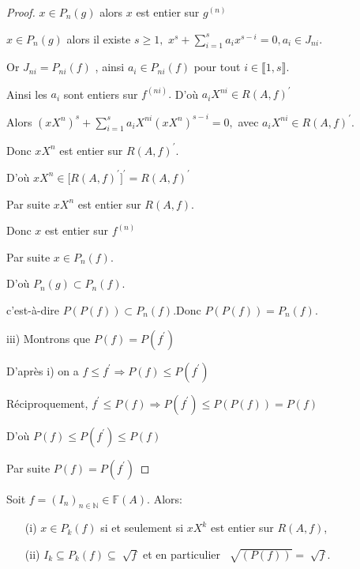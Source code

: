\begin{proof}
	$x\in P_{n}(g)$ alors $x$ est entier sur $g^{(n)}$
	
	$x\in P_{n}(g)$ alors il existe $s\geq 1,$ $x^{s}+\sum\limits_{i=1}^{s}a_{i}x^{s-i}=0,a_{i}\in J_{ni}$.
	
	Or $J_{ni}=P_{ni}(f)$ , ainsi $a_{i}\in P_{ni}(f)$ pour tout $i\in \llbracket 1, s \rrbracket.$
	
	Ainsi les $a_{i}$ sont entiers sur $f^{(ni)}.$ D'où $a_{i}X^{ni}\in R(A,f)^{\prime }$
	
	Alors $(xX^{n})^{s}+\sum\limits_{i=1}^{s}a_{i}X^{ni}(xX^{n})^{s-i}=0,$ avec 
	$a_{i}X^{ni}\in R(A,f)^{\prime }$.
	
	Donc $xX^{n}$ est entier sur $R(A,f)^{\prime }$.
	
	D'où $xX^{n}\in \lbrack R(A,f)^{\prime }]^{\prime }=R(A,f)^{\prime }$
	
	Par suite $xX^{n}$ est entier sur $R(A,f)$.
	
	Donc $x$ est entier sur $f^{(n)}$
	
	Par suite $x\in P_{n}(f).$
	
	D'où $P_{n}(g)\subset P_{n}(f).$
	
	c'est-\`{a}-dire $P(P(f))\subset P_{n}(f).$Donc $P(P(f))=P_{n}(f).$
	
	
	
	iii) Montrons que $P(f)=P(f^{\prime })$
	
	D'après i) on a $f\leq f^{\prime }\Rightarrow P(f)\leq P(f^{\prime })$
	
	Réciproquement, $f^{\prime }\leq P(f)\Rightarrow P(f^{\prime })\leq
	P(P(f))=P(f)$
	
	D'où $P(f)\leq P(f^{\prime })\leq P(f)$
	
	Par suite $P(f)=P(f^{\prime })$
\end{proof}
\begin{maproposition}
	Soit $f=(I_n)_{n \in \mathbb{N}} \in \mathbb{F}(A)$. Alors:\\
	\begin{enumerate}
		\item[(i)] $x \in P_k(f)$ si et seulement si $xX^k$ est entier sur $R(A,f)$,
		\item[(ii)] $ I_k \subseteq P_k(f) \subseteq \sqrt[]{f}$ et en particulier $\ \sqrt[]{(P(f))} = \sqrt[]{f}$.
	\end{enumerate}
\end{maproposition}
